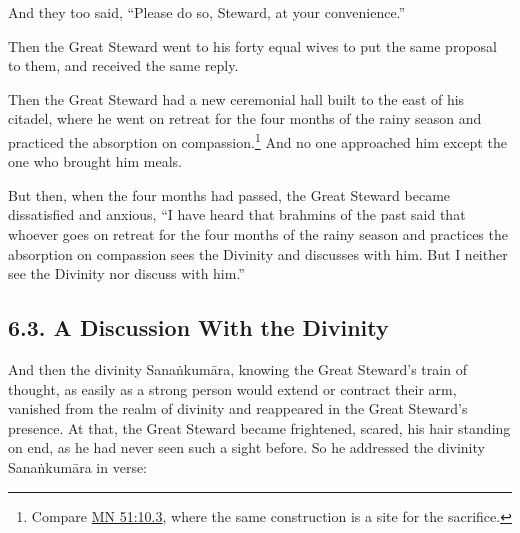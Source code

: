 \documentclass[12pt,openany]{book}%
\begin{document}
And they too said, “Please do so, Steward, at your convenience.” 

Then the Great Steward went to his forty equal wives to put the same proposal to them, and received the same reply. 

Then the Great Steward had a new ceremonial hall built to the east of his citadel, where he went on retreat for the four months of the rainy season and practiced the absorption on compassion.\footnote{Compare \href{https://suttacentral.net/mn51/en/sujato\#10.3}{MN 51:10.3}, where the same construction is a site for the sacrifice. } And no one approached him except the one who brought him meals. 

But then, when the four months had passed, the Great Steward became dissatisfied and anxious, “I have heard that brahmins of the past said that whoever goes on retreat for the four months of the rainy season and practices the absorption on compassion sees the Divinity and discusses with him. But I neither see the Divinity nor discuss with him.” 

\subsection*{6.3. A Discussion With the Divinity }

And then the divinity \textsanskrit{Sanaṅkumāra}, knowing the Great Steward’s train of thought, as easily as a strong person would extend or contract their arm, vanished from the realm of divinity and reappeared in the Great Steward’s presence. At that, the Great Steward became frightened, scared, his hair standing on end, as he had never seen such a sight before. So he addressed the divinity \textsanskrit{Sanaṅkumāra} in verse: 
\end{document}
